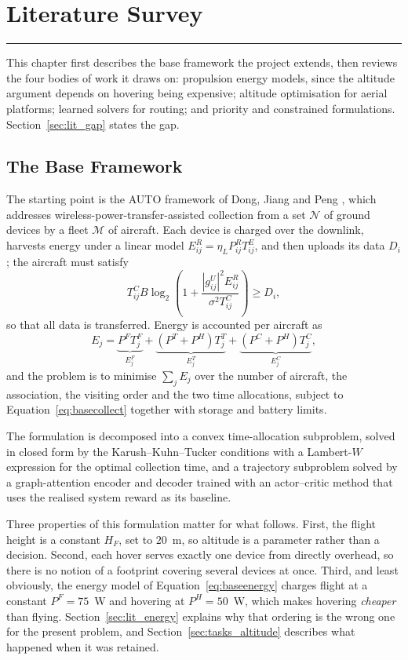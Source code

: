 \chapter{Literature Survey}
\label{chap:litsurvey}
\noindent \rule{6.6in}{0.01in}
\minitoc
\newpage

This chapter first describes the base framework the project extends, then reviews the four bodies of work it draws on: propulsion energy models, since the altitude argument depends on hovering being expensive; altitude optimisation for aerial platforms; learned solvers for routing; and priority and constrained formulations. Section~\ref{sec:lit_gap} states the gap.

\section{The Base Framework}
\label{sec:lit_base}

The starting point is the AUTO framework of Dong, Jiang and Peng \cite{paperA}, which addresses wireless-power-transfer-assisted collection from a set $\mathcal{N}$ of ground devices by a fleet $\mathcal{M}$ of aircraft. Each device is charged over the downlink, harvests energy under a linear model $E^R_{ij} = \eta_L P^R_{ij} T^E_{ij}$, and then uploads its data $D_i$; the aircraft must satisfy
\begin{equation}
T^C_{ij} B \log_2\!\left( 1 + \frac{|g^U_{ij}|^2 E^R_{ij}}{\sigma^2 T^C_{ij}} \right) \ge D_i ,
\label{eq:basecollect}
\end{equation}
so that all data is transferred. Energy is accounted per aircraft as
\begin{equation}
E_j = \underbrace{P^F T^F_j}_{E^F_j} + \underbrace{(P^T + P^H) T^T_j}_{E^T_j} + \underbrace{(P^C + P^H) T^C_j}_{E^C_j},
\label{eq:baseenergy}
\end{equation}
and the problem is to minimise $\sum_{j} E_j$ over the number of aircraft, the association, the visiting order and the two time allocations, subject to Equation~\eqref{eq:basecollect} together with storage and battery limits.

The formulation is decomposed into a convex time-allocation subproblem, solved in closed form by the Karush--Kuhn--Tucker conditions with a Lambert-$W$ expression for the optimal collection time, and a trajectory subproblem solved by a graph-attention encoder and decoder trained with an actor--critic method that uses the realised system reward as its baseline.

Three properties of this formulation matter for what follows. First, the flight height is a constant $H_F$, set to $20$~m, so altitude is a parameter rather than a decision. Second, each hover serves exactly one device from directly overhead, so there is no notion of a footprint covering several devices at once. Third, and least obviously, the energy model of Equation~\eqref{eq:baseenergy} charges flight at a constant $P^F = 75$~W and hovering at $P^H = 50$~W, which makes hovering \emph{cheaper} than flying. Section~\ref{sec:lit_energy} explains why that ordering is the wrong one for the present problem, and Section~\ref{sec:tasks_altitude} describes what happened when it was retained.

